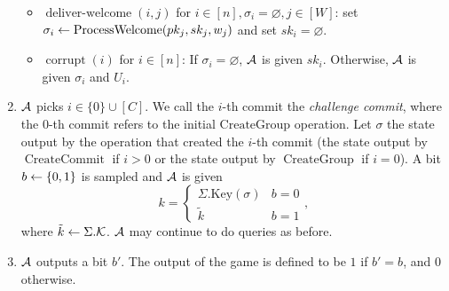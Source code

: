 \begin{definition}
\begin{enumerate}[1.]
\begin{itemize}
			      \item $\operatorname{deliver-welcome}(i, j)$ for $i \in [n], \sigma_i = \varnothing, j \in [W]$: set $\sigma_i \leftarrow \operatorname{ProcessWelcome}(pk_j, sk_j, w_j)$ and set $sk_i = \varnothing$.
			      \item $\operatorname{corrupt}(i)$ for $i \in [n]$: If $\sigma_i = \varnothing$, $\mathcal{A}$ is given $sk_i$. Otherwise, $\mathcal{A}$ is given $\sigma_i$ and $U_i$.
		      \end{itemize}
		\item $\mathcal{A}$ picks $i \in \{0\} \cup [C]$. We call the $i$-th commit the \emph{challenge commit}, where the $0$-th commit refers to the initial $\mathrm{CreateGroup}$ operation. Let $\sigma$ the state output by the operation that created the $i$-th commit (the state output by $\operatorname{CreateCommit}$ if $i > 0$ or the state output by $\operatorname{CreateGroup}$ if $i = 0$). A bit $b \leftarrow \{0, 1\}$ is sampled and $\mathcal{A}$ is given
		      \[
			      k = \begin{cases}
				      \Sigma.\mathrm{Key}(\sigma) & b = 0 \\
				      \tilde{k}                   & b = 1
			      \end{cases},
		      \]
		      where $\tilde{k} \leftarrow \Sigma.\mathcal{K}$. $\mathcal{A}$ may continue to do queries as before.
		\item $\mathcal{A}$ outputs a bit $b'$. The output of the game is defined to be $1$ if $b' = b$, and $0$ otherwise.
	\end{enumerate}


\end{definition}
